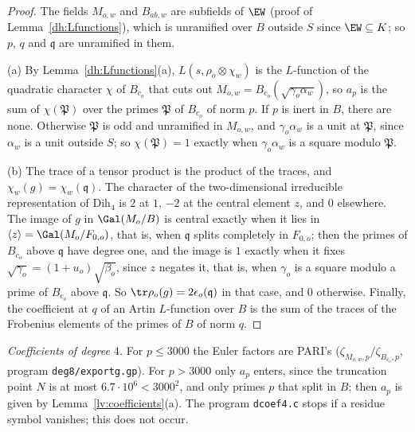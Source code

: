 \begin{proof}
The fields $M_{o,w}$ and $B_{ab,w}$ are subfields of $\EW$ (proof of
Lemma~\ref{dh:Lfunctions}), which is unramified over $B$ outside $S$ since
$\EW\subseteq K$; so $p$, $q$ and $\mathfrak q$ are unramified in them.

(a) By Lemma~\ref{dh:Lfunctions}(a), $L(s,\rho_o\otimes\chi_w)$ is the
$L$-function of the quadratic character $\chi$ of $B_{c_o}$ that cuts out
$M_{o,w}=B_{c_o}(\sqrt{\gamma_o\alpha_w})$, so $a_p$ is the sum of
$\chi(\mathfrak P)$ over the primes $\mathfrak P$ of $B_{c_o}$ of norm $p$.
If $p$ is inert in $B$, there are none. Otherwise $\mathfrak P$ is odd and
unramified in $M_{o,w}$, and $\gamma_o\alpha_w$ is a unit at $\mathfrak P$,
since $\alpha_w$ is a unit outside $S$; so $\chi(\mathfrak P)=1$ exactly when
$\gamma_o\alpha_w$ is a square modulo $\mathfrak P$.

(b) The trace of a tensor product is the product of the traces, and
$\chi_w(g)=\chi_w(\mathfrak q)$. The character of the two-dimensional
irreducible representation of $\mathrm{Dih}_4$ is $2$ at $1$, $-2$ at the
central element $z$, and $0$ elsewhere. The image of $g$ in $\Gal(M_o/B)$ is
central exactly when it lies in $\langle z\rangle=\Gal(M_o/F_{0,o})$, that
is, when $\mathfrak q$ splits completely in $F_{0,o}$; then the primes of
$B_{c_o}$ above $\mathfrak q$ have degree one, and the image is $1$ exactly
when it fixes $\sqrt{\gamma_o}=(1+u_o)\sqrt{\beta_o}$, since $z$ negates
it, that is, when $\gamma_o$ is a square modulo a prime of $B_{c_o}$ above
$\mathfrak q$. So $\tr\rho_o(g)=2\epsilon_o(\mathfrak q)$ in that case, and
$0$ otherwise. Finally, the coefficient at $q$ of an Artin $L$-function over
$B$ is the sum of the traces of the Frobenius elements of the primes of $B$
of norm $q$.
\end{proof}

\emph{Coefficients of degree $4$.} For $p\le3000$ the Euler factors are
PARI's ($\zeta_{M_{o,w},p}/\zeta_{B_{c_o},p}$, program \texttt{deg8/exportg.gp}).
For $p>3000$ only $a_p$ enters, since the truncation point $N$ is at most
$6.7\cdot10^6<3000^2$, and only primes $p$ that split in $B$; then $a_p$ is
given by Lemma~\ref{lv:coefficients}(a). The program \texttt{dcoef4.c} stops
if a residue symbol vanishes; this does not occur.

